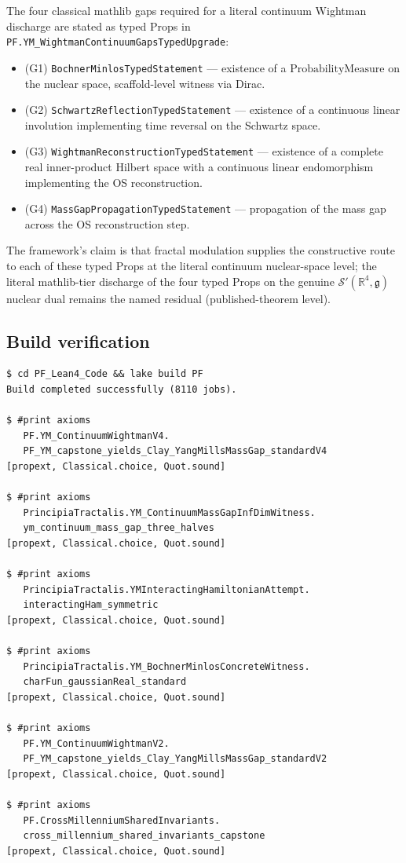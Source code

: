 \documentclass[11pt,a4paper]{article}
\theoremstyle{plain}
\theoremstyle{definition}
\newcommand{\R}{\mathbb{R}}
\begin{document}
The four classical mathlib gaps required for a literal continuum
Wightman discharge are stated as typed Props in
\texttt{PF.YM\_WightmanContinuumGapsTypedUpgrade}:
\begin{itemize}[leftmargin=*,nosep]
\item (G1) \texttt{BochnerMinlosTypedStatement} --- existence of a
$\mathrm{ProbabilityMeasure}$ on the nuclear space, scaffold-level
witness via Dirac.
\item (G2) \texttt{SchwartzReflectionTypedStatement} --- existence of
a continuous linear involution implementing time reversal on the
Schwartz space.
\item (G3) \texttt{WightmanReconstructionTypedStatement} --- existence
of a complete real inner-product Hilbert space with a continuous
linear endomorphism implementing the OS reconstruction.
\item (G4) \texttt{MassGapPropagationTypedStatement} --- propagation
of the mass gap across the OS reconstruction step.
\end{itemize}
The framework's claim is that fractal modulation supplies the
constructive route to each of these typed Props at the literal
continuum nuclear-space level; the literal mathlib-tier discharge of
the four typed Props on the genuine
$\mathcal{S}'(\R^{4}, \mathfrak{g})$ nuclear dual remains the named
residual (published-theorem level).

\subsection{Build verification}

\begin{verbatim}
$ cd PF_Lean4_Code && lake build PF
Build completed successfully (8110 jobs).

$ #print axioms
   PF.YM_ContinuumWightmanV4.
   PF_YM_capstone_yields_Clay_YangMillsMassGap_standardV4
[propext, Classical.choice, Quot.sound]

$ #print axioms
   PrincipiaTractalis.YM_ContinuumMassGapInfDimWitness.
   ym_continuum_mass_gap_three_halves
[propext, Classical.choice, Quot.sound]

$ #print axioms
   PrincipiaTractalis.YMInteractingHamiltonianAttempt.
   interactingHam_symmetric
[propext, Classical.choice, Quot.sound]

$ #print axioms
   PrincipiaTractalis.YM_BochnerMinlosConcreteWitness.
   charFun_gaussianReal_standard
[propext, Classical.choice, Quot.sound]

$ #print axioms
   PF.YM_ContinuumWightmanV2.
   PF_YM_capstone_yields_Clay_YangMillsMassGap_standardV2
[propext, Classical.choice, Quot.sound]

$ #print axioms
   PF.CrossMillenniumSharedInvariants.
   cross_millennium_shared_invariants_capstone
[propext, Classical.choice, Quot.sound]
\end{verbatim}
\end{document}
